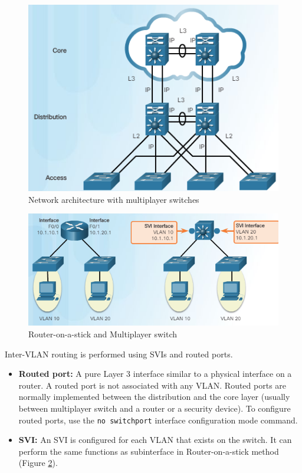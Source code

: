 \begin{figure}[hbtp]
\caption{Network architecture with multiplayer switches}\label{NetArch}
\centering
\includegraphics[scale=0.6]{pictures/NetArch.PNG}
\end{figure}


\begin{figure}[hbtp]
\caption{Router-on-a-stick and Multiplayer switch}\label{Layer3sw}
\centering
\includegraphics[scale=0.6]{pictures/Layer3sw.PNG}
\end{figure}


Inter-VLAN routing is performed using SVIs and routed ports.
\begin{itemize}
\item \textbf{Routed port:} A pure Layer 3 interface similar to a physical interface on a router. A routed port is not associated with any VLAN. Routed ports are normally implemented between the distribution and the core layer (usually between multiplayer switch and a router or a security device). To configure routed ports, use the \verb|no switchport| interface configuration mode command.

\item \textbf{SVI:} An SVI is configured for each VLAN that exists on the switch. It can perform the same functions as subinterface in Router-on-a-stick method (Figure \ref{Layer3sw}). 
\end{itemize}

